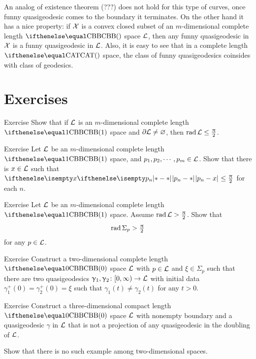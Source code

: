 An analog of existence theorem (???) does not hold for this type of curves,
once funny quasigeodesic comes to the boundary it terminates.
On the other hand it has a nice property: if $\mathcal{X}$ is a convex closed subset of an $m$-dimensional complete length $\Alex{}$ space $\mathcal{L}$, then any funny quasigeodesic in $\mathcal{X}$ is a funny quasigeodesic in $\mathcal{L}$.
Also, it is easy to see that in a complete length $\CAT{}$ space, 
the class of funny quasigeodesics coinsides with class of geodesics.








\section{Exercises}

\begin{thm}{Exercise} Show that if $\mathcal{L}$ is an $m$-dimensional complete length $\Alex{1}$ space and $\partial \mathcal{L}\not=\varnothing$, then $\rad \spc{L}\le\tfrac\pi2$.
\end{thm}


\begin{thm}{Exercise}
Let $\mathcal{L}$ be an $m$-dimensional complete length $\Alex{1}$ space, and $p_1,p_2,\cdots,p_m\in \spc{L}$. 
Show that there is $x\in \spc{L}$ such that $\dist{p_n}{x}{}\le\frac\pi2$ for each $n$.
\end{thm}

\begin{thm}{Exercise}
Let $\mathcal{L}$ be an $m$-dimensional complete length $\Alex1$ space.
Assume $\mathop{\rm rad}\nolimits\mathcal{L}>\tfrac{\uppi}2$.
Show that 
\[\mathop{\rm rad}\nolimits\Sigma_p>\tfrac{\uppi}2\]
for any $p\in \spc{L}$.
\end{thm}

\begin{thm}{Exercise} Construct a two-dimensional complete length $\Alex0$ space $\mathcal{L}$ with $p\in \spc{L}$ and $\xi\in \Sigma_p$ such that there are two quasigeodesics $\gamma_1,\gamma_2\:[0,\infty)\to \spc{L}$ with initial data $\gamma_1^+(0)=\gamma_2^+(0)=\xi$ such that $\gamma_1(t)\not=\gamma_2(t)$ for any $t>0$.
\end{thm}

\begin{thm}{Exercise}
Construct a three-dimensional compact length $\Alex0$ space $\mathcal{L}$ with nonempty boundary and a quasigeodesic $\gamma$ in $\mathcal{L}$ that is not a projection of any quasigeodesic in the doubling of $\mathcal{L}$.

Show that there is no such example among two-dimensional spaces.
\end{thm}
